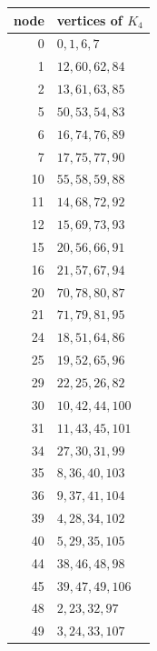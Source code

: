\begin{center}\small
\begin{tabular}{r|l}
node & vertices of $K_4$\\\hline
0 & $0,1,6,7$\\
1 & $12,60,62,84$\\
2 & $13,61,63,85$\\
5 & $50,53,54,83$\\
6 & $16,74,76,89$\\
7 & $17,75,77,90$\\
10 & $55,58,59,88$\\
11 & $14,68,72,92$\\
12 & $15,69,73,93$\\
15 & $20,56,66,91$\\
16 & $21,57,67,94$\\
20 & $70,78,80,87$\\
21 & $71,79,81,95$\\
24 & $18,51,64,86$\\
25 & $19,52,65,96$\\
29 & $22,25,26,82$\\
30 & $10,42,44,100$\\
31 & $11,43,45,101$\\
34 & $27,30,31,99$\\
35 & $8,36,40,103$\\
36 & $9,37,41,104$\\
39 & $4,28,34,102$\\
40 & $5,29,35,105$\\
44 & $38,46,48,98$\\
45 & $39,47,49,106$\\
48 & $2,23,32,97$\\
49 & $3,24,33,107$\\
\end{tabular}
\end{center}
